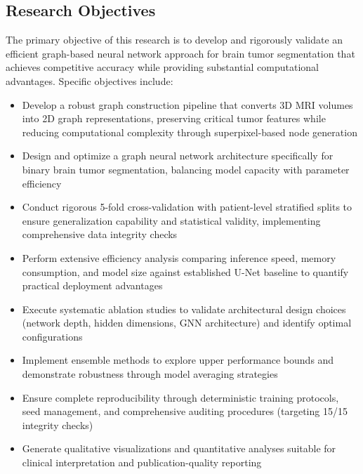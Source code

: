 \documentclass{article}
\begin{document}
\subsection{Research Objectives}

The primary objective of this research is to develop and rigorously validate an efficient graph-based neural network approach for brain tumor segmentation that achieves competitive accuracy while providing substantial computational advantages. Specific objectives include:

 \begin{itemize}
    \item Develop a robust graph construction pipeline that converts 3D MRI volumes into 2D graph representations, preserving critical tumor features while reducing computational complexity through superpixel-based node generation
    
    \item Design and optimize a graph neural network architecture specifically for binary brain tumor segmentation, balancing model capacity with parameter efficiency
    
    \item Conduct rigorous 5-fold cross-validation with patient-level stratified splits to ensure generalization capability and statistical validity, implementing comprehensive data integrity checks
    
    \item Perform extensive efficiency analysis comparing inference speed, memory consumption, and model size against established U-Net baseline to quantify practical deployment advantages
    
    \item Execute systematic ablation studies to validate architectural design choices (network depth, hidden dimensions, GNN architecture) and identify optimal configurations
    
    \item Implement ensemble methods to explore upper performance bounds and demonstrate robustness through model averaging strategies
    
    \item Ensure complete reproducibility through deterministic training protocols, seed management, and comprehensive auditing procedures (targeting 15/15 integrity checks)
    
    \item Generate qualitative visualizations and quantitative analyses suitable for clinical interpretation and publication-quality reporting
 \end{itemize}
\end{document}
